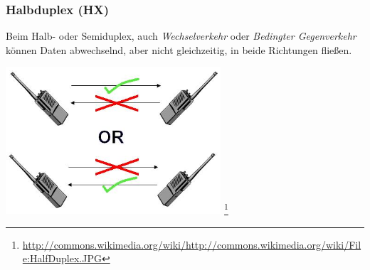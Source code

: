 \begin{frame}
    \frametitle{Halbduplex (HX)}

    Beim Halb- oder Semiduplex, auch \emph{Wechselverkehr} oder \emph{Bedingter
    Gegenverkehr} können Daten abwechselnd, aber nicht gleichzeitig, in beide
    Richtungen fließen.

    \begin{center}
        \includegraphics[width=0.6\textwidth,height=.6\textheight,keepaspectratio]{bv11/HalfDuplex.jpg}
        \footnote{\tiny \url{http://commons.wikimedia.org/wiki/http://commons.wikimedia.org/wiki/File:HalfDuplex.JPG}}
    \end{center}

\end{frame}

